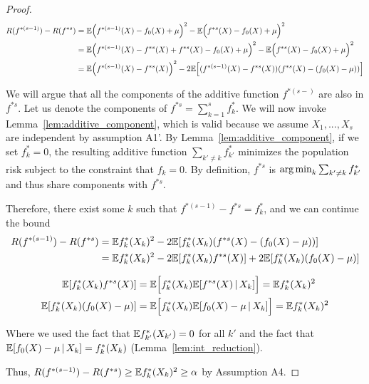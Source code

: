 \begin{proof}

\begin{align*}
R(f^{*(s-1)}) - R(f^{*s}) &= {\mathbb E}\Big(f^{*(s-1)}(X) - f_0(X) + \mu\Big)^2 
                              - {\mathbb E}\Big(f^{*s}(X) - f_0(X) + \mu\Big)^2 \\
    &= {\mathbb E}\Big( f^{*(s-1)}(X) - f^{*s}(X) + f^{*s}(X) - f_0(X) + \mu\Big)^2 
                                 - {\mathbb E}\Big(f^{*s}(X) - f_0(X) + \mu\Big)^2 \\
    &= {\mathbb E}\Big( f^{*(s-1)}(X) - f^{*s}(X)\Big)^2 
                - 2 {\mathbb E}\Big[ (f^{*(s-1)}(X) - f^{*s}(X)) (f^{*s}(X) - (f_0(X)-\mu)) \Big]
\end{align*}

We will argue that all the components of the additive function $f^{*(s-)}$ are also in $f^{*s}$. Let us denote the components of $f^{*s} = \sum_{k=1}^s f_k^*$. We will now invoke Lemma~\ref{lem:additive_component}, which is valid because we assume $X_1,...,X_s$ are independent by assumption A1'. By Lemma~\ref{lem:additive_component}, if we set $f^*_k = 0$, the resulting additive function $\sum_{k'\neq k} f_{k'}^*$ minimizes the population risk subject to the constraint that $f_k = 0$. By definition, $f^{*s}$ is $\mathop{\text{\rm arg\,min}}_k \sum_{k'\neq k} f_{k'}^*$ and thus share components with $f^{*s}$.

Therefore, there exist some $k$ such that $f^{*(s-1)} - f^{*s} = f^*_k$, and we can continue the bound
\begin{align*}
R(f^{*(s-1)}) - R(f^{*s}) &= {\mathbb E} f^*_k(X_k)^2 - 2 {\mathbb E}[ f^*_k(X_k) ( f^{*s}(X) - (f_0(X)-\mu) )] \\
    &= {\mathbb E} f^*_k(X_k)^2 - 2 {\mathbb E}[ f^*_k(X_k) f^{*s} (X)] + 2 {\mathbb E}[ f^*_k(X_k) (f_0(X)-\mu) ] 
\end{align*}

\begin{align*}
{\mathbb E}[ f^*_k(X_k) f^{*s} (X)]  &= {\mathbb E}\Big[ f^*_k (X_k) {\mathbb E}[ f^{*s} (X) \,|\, X_k ] \Big] = {\mathbb E} f^*_k(X_k)^2  \\
{\mathbb E}[ f^*_k(X_k)(f_0(X) - \mu) ] &= {\mathbb E}\Big[ f^*_k(X_k) {\mathbb E}[ f_0(X) - \mu \,|\, X_k ] \Big] = {\mathbb E} f^*_k(X_k)^2 
\end{align*}

Where we used the fact that ${\mathbb E} f^*_{k'} (X_{k'}) = 0$ for all $k'$ and the fact that ${\mathbb E}[ f_0(X) - \mu \,|\, X_k] = f^*_k(X_k)$ (Lemma~\ref{lem:int_reduction}).

Thus, $R(f^{*(s-1)}) - R(f^{*s}) \geq {\mathbb E} f^*_k(X_k)^2 \geq \alpha$ by Assumption A4.

\end{proof}


